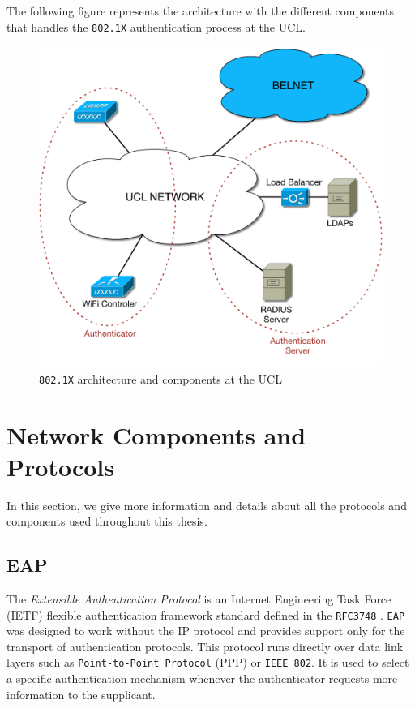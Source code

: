 The following figure represents the architecture with the different components that handles the \texttt{802.1X} authentication process at the UCL. 

\begin{figure}[H]
	\includegraphics[width=1\linewidth]{Pictures/chapter2/802-archi.png}
	\caption{\texttt{802.1X} architecture and components at the UCL}
\end{figure}



\section{Network Components and Protocols}
In this section, we give more information and details about all the protocols and components used throughout this thesis.

\subsection{EAP}
The \textit{Extensible Authentication Protocol} is an Internet Engineering Task Force (IETF) flexible authentication framework standard defined in the \texttt{RFC3748} \cite{rfc3748}. \texttt{EAP} was designed to work without the IP protocol and provides support only for the transport of authentication protocols. This protocol runs directly over data link layers such as \texttt{Point-to-Point Protocol} (PPP) or \texttt{IEEE 802}. It is used to select a specific authentication mechanism whenever the authenticator requests more information to the supplicant.

